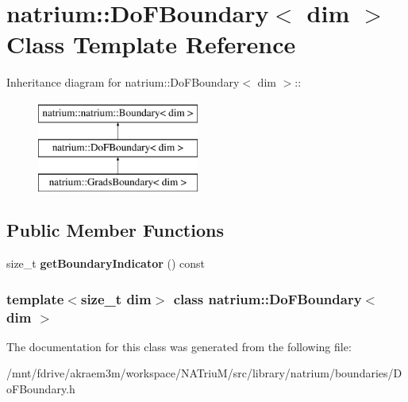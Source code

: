 \hypertarget{classnatrium_1_1DoFBoundary}{
\section{natrium::DoFBoundary$<$ dim $>$ Class Template Reference}
\label{classnatrium_1_1DoFBoundary}
}
Inheritance diagram for natrium::DoFBoundary$<$ dim $>$::\begin{figure}[H]
\begin{center}
\leavevmode
\includegraphics[height=3cm]{classnatrium_1_1DoFBoundary}
\end{center}
\end{figure}
\subsection*{Public Member Functions}
\begin{DoxyCompactItemize}
\item 
\hypertarget{classnatrium_1_1DoFBoundary_adce222c92d4460936556cb3f3efd2f50}{
size\_\-t {\bfseries getBoundaryIndicator} () const }
\label{classnatrium_1_1DoFBoundary_adce222c92d4460936556cb3f3efd2f50}

\end{DoxyCompactItemize}
\subsubsection*{template$<$size\_\-t dim$>$ class natrium::DoFBoundary$<$ dim $>$}



The documentation for this class was generated from the following file:\begin{DoxyCompactItemize}
\item 
/mnt/fdrive/akraem3m/workspace/NATriuM/src/library/natrium/boundaries/DoFBoundary.h\end{DoxyCompactItemize}
